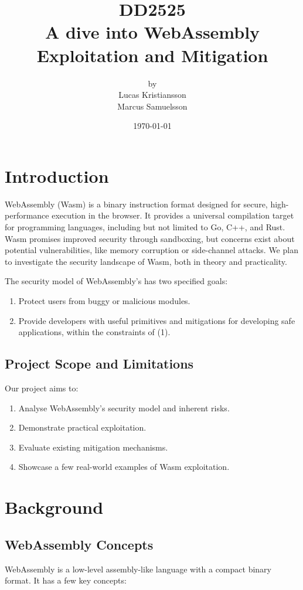\documentclass{article}
\title{DD2525\\A dive into WebAssembly \\Exploitation and Mitigation}
\author{by \\Lucas Kristiansson\\Marcus Samuelsson}
\date{\today}
\begin{document}
\maketitle

\newpage

\section{Introduction}
WebAssembly (Wasm) is a binary instruction format designed for secure, high-performance execution in
the browser. It provides a universal compilation target for programming languages, including but not
limited to Go, C++, and Rust. Wasm promises improved security through sandboxing, but concerns exist
about potential vulnerabilities, like memory corruption or side-channel attacks. We plan to investigate the
security landscape of Wasm, both in theory and practicality.

The security model of WebAssembly's has two specified goals:

\begin{enumerate}
    \item Protect users from buggy or malicious modules.
    \item Provide developers with useful primitives and mitigations for developing safe applications, within the constraints of (1).
\end{enumerate}

\subsection{Project Scope and Limitations}
Our project aims to:

\begin{enumerate}
    \item Analyse WebAssembly's security model and inherent risks.
    \item Demonstrate practical exploitation.
    \item Evaluate existing mitigation mechanisms.
    \item Showcase a few real-world examples of Wasm exploitation.
\end{enumerate}

\section{Background}
\subsection{WebAssembly Concepts}
WebAssembly is a low-level assembly-like language with a compact binary format. It has a few key concepts:
\end{document}
